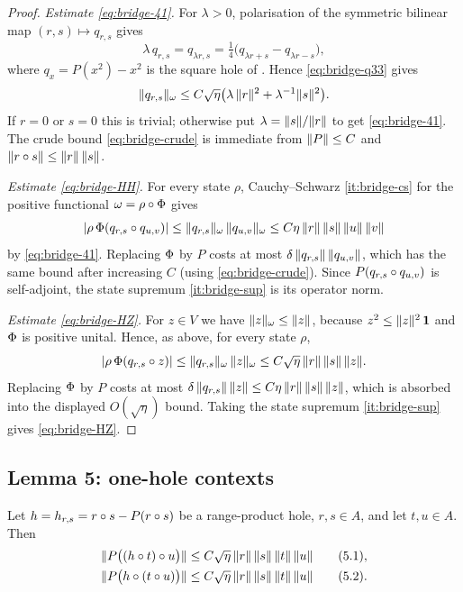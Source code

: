\begin{proof}
\emph{Estimate \eqref{eq:bridge-41}.} For $\lambda>0$, polarisation of the
symmetric bilinear map $(r,s)\mapsto q_{r,s}$ gives
\[
  \lambda\,q_{r,s}=q_{\lambda r,s}
   =\tfrac14\big(q_{\lambda r+s}-q_{\lambda r-s}\big),
\]
where $q_x=P(x^2)-x^2$ is the square hole of .
Hence \eqref{eq:bridge-q33} gives
\[
  \lVert q_{r,s} \rVert_\omega
   \le C\sqrt\eta\big(\lambda\,\lVert r \rVert^2+\lambda^{-1}\lVert s \rVert^2\big).
\]
If $r=0$ or $s=0$ this is trivial; otherwise put $\lambda=\lVert s \rVert/\lVert r \rVert$ to
get \eqref{eq:bridge-41}. The crude bound \eqref{eq:bridge-crude} is immediate
from $\lVert P \rVert\le C$ and $\lVert r\circ s \rVert\le\lVert r \rVert\,\lVert s \rVert$.

\emph{Estimate \eqref{eq:bridge-HH}.} For every state $\rho$, Cauchy--Schwarz
\ref{it:bridge-cs} for the positive functional $\omega=\rho\circ\Phi$ gives
\[
  \lvert\rho\,\Phi(q_{r,s}\circ q_{u,v})\rvert
   \le\lVert q_{r,s} \rVert_\omega\,\lVert q_{u,v} \rVert_\omega
   \le C\eta\,\lVert r \rVert\,\lVert s \rVert\,\lVert u \rVert\,\lVert v \rVert
\]
by \eqref{eq:bridge-41}. Replacing $\Phi$ by $P$ costs at most
$\delta\,\lVert q_{r,s} \rVert\,\lVert q_{u,v} \rVert$, which has the same bound after
increasing $C$ (using \eqref{eq:bridge-crude}). Since $P(q_{r,s}\circ q_{u,v})$ is
self-adjoint, the state supremum \ref{it:bridge-sup} is its operator norm.

\emph{Estimate \eqref{eq:bridge-HZ}.} For $z\in V$ we have
$\lVert z \rVert_\omega\le\lVert z \rVert$, because $z^2\le\lVert z \rVert^2\,\mathbf{1}$ and $\Phi$ is
positive unital. Hence, as above, for every state $\rho$,
\[
  \lvert\rho\,\Phi(q_{r,s}\circ z)\rvert
   \le\lVert q_{r,s} \rVert_\omega\,\lVert z \rVert_\omega
   \le C\sqrt\eta\,\lVert r \rVert\,\lVert s \rVert\,\lVert z \rVert.
\]
Replacing $\Phi$ by $P$ costs at most $\delta\,\lVert q_{r,s} \rVert\,\lVert z \rVert\le
C\eta\,\lVert r \rVert\,\lVert s \rVert\,\lVert z \rVert$, which is absorbed into the displayed
$O(\sqrt\eta)$ bound. Taking the state supremum \ref{it:bridge-sup} gives
\eqref{eq:bridge-HZ}.
\end{proof}

\subsection*{Lemma 5: one-hole contexts}

\begin{lemma}\label{lem:bridge-onehole}
Let $h=h_{r,s}=r\circ s-P(r\circ s)$ be a range-product hole, $r,s\in A$, and let
$t,u\in A$. Then
\begin{align}
  \lVert P\big((h\circ t)\circ u\big) \rVert
    &\le C\sqrt\eta\,\lVert r \rVert\,\lVert s \rVert\,\lVert t \rVert\,\lVert u \rVert
    \qquad\text{\normalfont(5.1)}, \label{eq:bridge-51}\\
  \lVert P\big(h\circ(t\circ u)\big) \rVert
    &\le C\sqrt\eta\,\lVert r \rVert\,\lVert s \rVert\,\lVert t \rVert\,\lVert u \rVert
    \qquad\text{\normalfont(5.2)}. \label{eq:bridge-52}
\end{align}
\end{lemma}

